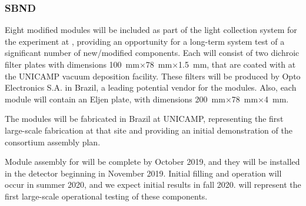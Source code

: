 \subsubsection{SBND}
\label{sec:valid-sbnd}

Eight modified  modules will be included as part of the light collection system for the  experiment at , providing an opportunity for a long-term system test of a significant number of new/modified components.  Each   will consist of two dichroic filter plates with dimensions
\SI{100}{mm}$\times$\SI{78}{mm}$\times$\SI{1.5}{mm},
 that are coated with  at the UNICAMP vacuum deposition facility.  These filters will be produced by Opto Electronics S.A. in Brazil, a leading potential vendor for the   modules.  Also, each  module will contain an Eljen  plate, 
 with dimensions 
\SI{200}{mm}$\times$\SI{78}{mm}$\times$\SI{4}{mm}.


The   modules will be fabricated in Brazil at UNICAMP, representing the first large-scale fabrication at that site and providing an initial demonstration of the   consortium assembly plan.

Module assembly for  will be complete by October 2019, and they will be installed in the detector beginning in November 2019.  Initial filling and operation will occur in summer 2020, and we expect initial results in fall 2020.   will represent the first large-scale operational testing of these components.



